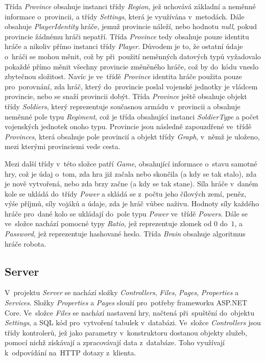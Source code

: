 \documentclass[a4paper,12pt]{article}
\begin{document}
Třída \textit{Province} obsahuje instanci třídy \textit{Region}, jež uchovává základní a neměnné informace o~provincii, a třídy \textit{Settings}, která je využívána v~metodách. Dále obsahuje \textit{PlayerIdentity} hráče, jemuž provincie náleží, nebo hodnotu \textit{null}, pokud provincie žádnému hráči nepatří. Třída \textit{Province} tedy obsahuje pouze identitu hráče a nikoliv přímo instanci třídy \textit{Player}. Důvodem je to, že ostatní údaje o~hráči se mohou měnit, což by při~použití neměnných datových typů vyžadovalo pokaždé přímo měnit všechny provincie změněného hráče, což by do~kódu vneslo zbytečnou složitost. Navíc je ve~třídě \textit{Province} identita hráče použita pouze pro~porovnání, zda hráč, který do~provincie poslal vojenské jednotky je vládcem provincie, nebo se snaží provincii dobýt. Třída \textit{Province} ještě obsahuje objekt třídy \textit{Soldiers}, který reprezentuje současnou armádu v~provincii a obsahuje neměnné pole typu \textit{Regiment}, což je třída obsahující instanci \textit{SoldierType} a počet vojenských jednotek onoho typu. Provincie jsou následně zapouzdřené ve~třídě \textit{Provinces}, která obsahuje pole provincií a objekt třídy \textit{Graph}, v~němž je uloženo, mezi kterými provinciemi vede cesta.

Mezi další třídy v~této složce patří \textit{Game}, obsahující informace o~stavu samotné hry, což je údaj o~tom, zda hra již začala nebo skončila (a kdy se tak stalo), zda je nově vytvořená, nebo zda brzy začne (a kdy se tak stane). Síla hráče v~daném kole se ukládá do~třídy \textit{Power} a skládá se z~počtu jeho čílových zemí, peněz, výše příjmů, síly vojáků a údaje, zda je hráč vůbec naživu. Hodnoty síly každého hráče pro~dané kolo se ukládají do~pole typu \textit{Power} ve~třídě \textit{Powers}. Dále se ve~složce nachází pomocné typy \textit{Ratio}, jež reprezentuje zlomek od $0$ do~$1$, a \textit{Password}, jež reprezentuje hashované heslo. Třída \textit{Brain} obsahuje algoritmus hráče robota.

\subsection{Server}
V~projektu \textit{Server} se nachází složky \textit{Controllers}, \textit{Files}, \textit{Pages}, \textit{Properties} a \textit{Services}. Složky \textit{Properties} a \textit{Pages} slouží pro~potřeby frameworku ASP.NET Core. Ve~složce \textit{Files} se nachází nastavení hry, načtená při~spuštění do~objektu \textit{Settings}, a SQL kód pro~vytvoření tabulek v~databázi. Ve~složce \textit{Controllers} jsou třídy kontrolerů, jež jako parametry v~konstruktoru dostanou objekty služeb, pomocí nichž získávají a zpracovávají data z~databáze. Toho využívají k~odpovídání na~HTTP dotazy z~klienta.
\end{document}
